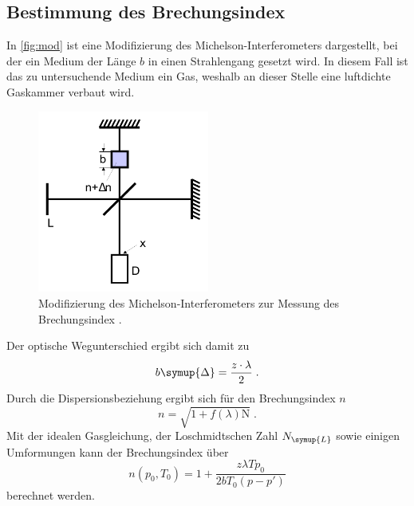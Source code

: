 \subsection{Bestimmung des Brechungsindex}
In \autoref{fig:mod} ist eine Modifizierung des Michelson-Interferometers dargestellt, bei der ein Medium der Länge $b$ in einen Strahlengang 
gesetzt wird. In diesem Fall ist das zu untersuchende Medium ein Gas, weshalb an dieser Stelle eine luftdichte Gaskammer verbaut wird.
\begin{figure}
    \centering
    \includegraphics[height = 6cm]{modbrech.pdf}
    \caption{Modifizierung des Michelson-Interferometers zur Messung des Brechungsindex \cite{ap401}.}
    \label{fig:mod}
\end{figure}
Der optische Wegunterschied ergibt sich damit zu 
\begin{equation*}
    b\symup{\Delta} = \frac{z\cdot\lambda}{2} \; . 
\end{equation*}
Durch die Dispersionsbeziehung ergibt sich für den Brechungsindex $n$
\begin{equation*}
    n = \sqrt{1+f\left(\lambda\right)\text{N}} \; .
\end{equation*}
Mit der idealen Gasgleichung, der Loschmidtschen Zahl $N_{\symup{L}}$ sowie einigen Umformungen kann der Brechungsindex über
\begin{equation*}
    n\left(p_0, T_0\right) = 1 + \frac{z\lambda T p_0}{2bT_0\left(p-p'\right)}
\end{equation*}
berechnet werden. 